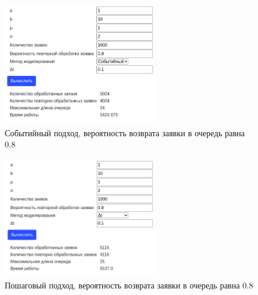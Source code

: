 \begin{figure}[H]
    \centering
    \includegraphics[width=0.6\textwidth]{images/scr07.png}
    \caption{Событийный подход, вероятность возврата заявки в очередь равна 0.8}
\end{figure}
\begin{figure}[H]
    \centering
    \includegraphics[width=0.6\textwidth]{images/scr08.png}
    \caption{Пошаговый подход, вероятность возврата заявки в очередь равна 0.8}
\end{figure}

